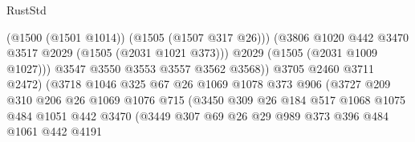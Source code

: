 \begin{lexlean}{RustStd}
\begin{coremodule}
                                        (@1500 (@1501 @1014))
                                        (@1505 (@1507 @317 @26)))
                                      (@3806
                                        @1020
                                        @442
                                        @3470
                                        @3517
                                        @2029
                                        (@1505 (@2031 @1021 @373)))
                                      @2029
                                      (@1505 (@2031 @1009 @1027)))
                                    @3547
                                    @3550
                                    @3553
                                    @3557
                                    @3562
                                    @3568))
                                @3705
                                @2460
                                @3711
                                @2472)
                              (@3718
                                @1046
                                @325
                                @67
                                @26
                                @1069
                                @1078
                                @373
                                @906
                                (@3727
                                  @209
                                  @310
                                  @206
                                  @26
                                  @1069
                                  @1076
                                  @715
                                  (@3450
                                    @309
                                    @26
                                    @184
                                    @517
                                    @1068
                                    @1075
                                    @484
                                    @1051
                                    @442
                                    @3470
                                    (@3449
                                      @307
                                      @69
                                      @26
                                      @29
                                      @989
                                      @373
                                      @396
                                      @484
                                      @1061
                                      @442
                                      @4191

\end{coremodule}
\end{lexlean}

